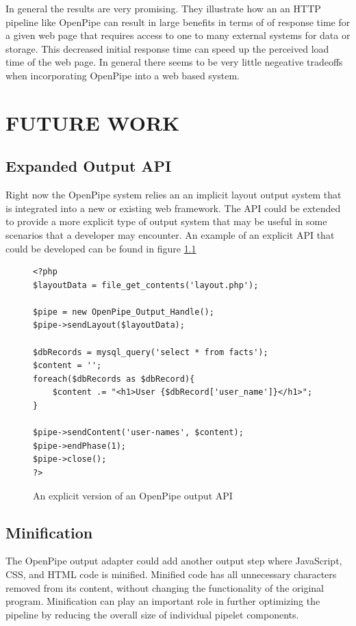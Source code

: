 \documentclass[12pt]{report}
\begin{document}
In general the results are very promising.  They illustrate how an an HTTP pipeline like OpenPipe can result in large benefits in terms of of response time for a given web page that requires access to one to many external systems for data or storage. This decreased initial response time can speed up the perceived load time of the web page. In general there seems to be very little negeative tradeoffs when incorporating OpenPipe into a web based system.

\chapter{FUTURE WORK}

\section{Expanded Output API}

Right now the OpenPipe system relies an an implicit layout output system that is integrated into a new or existing web framework. The API could be extended to provide a more explicit type of output system that may be useful in some scenarios that a developer may encounter. An example of an explicit API that could  be developed can be found in figure \ref{fig:explicitApi}

\begin{figure}[H]
\label{fig:explicitApi}
\begin{lstlisting}
<?php
$layoutData = file_get_contents('layout.php');

$pipe = new OpenPipe_Output_Handle();
$pipe->sendLayout($layoutData);

$dbRecords = mysql_query('select * from facts');
$content = '';
foreach($dbRecords as $dbRecord){
	$content .= "<h1>User {$dbRecord['user_name']}</h1>";
}

$pipe->sendContent('user-names', $content);
$pipe->endPhase(1);
$pipe->close();
?>
\end{lstlisting}
\caption{An explicit version of an OpenPipe output API}
\end{figure}

\section{Minification}
The OpenPipe output adapter could add another output step where JavaScript, CSS, and HTML code is minified. Minified code has all unnecessary characters removed from its content, without changing the functionality of the original program. Minification can play an important role in further optimizing the pipeline by reducing the overall size of individual pipelet components.
\end{document}
